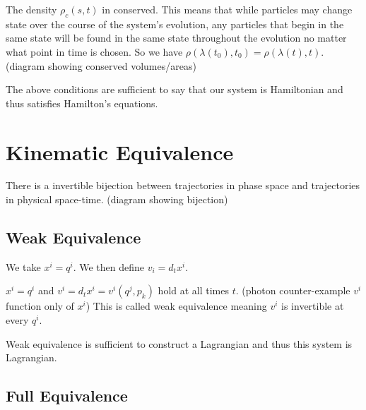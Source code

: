 \documentclass{article}
\begin{document}
\begin{prop}
	The density $\rho_c(s,t)$ in conserved. This means that while particles may change state over the course of the system's evolution, any particles that begin in the same state will be found in the same state throughout the evolution no matter what point in time is chosen. So we have $\rho(\lambda(t_0),t_0) = \rho(\lambda(t),t)$. (diagram showing conserved volumes/areas)
\end{prop}

\begin{prop}
	The above conditions are sufficient to say that our system is Hamiltonian and thus satisfies Hamilton's equations.
\end{prop} 
	

\section{Kinematic Equivalence}

\begin{assump}
	There is a invertible bijection between trajectories in phase space and trajectories in physical space-time. (diagram showing bijection)
\end{assump}

\subsection{Weak Equivalence}

\begin{defn}
	We take $x^i = q^i$. We then define $v_i = d_tx^i$.
\end{defn}

\begin{prop}
	$x^i = q^i$ and $v^i = d_tx^i = v^i(q^j,p_k)$ hold at all times $t$. (photon counter-example $v^i$ function only of $x^i$) This is called weak equivalence meaning $v^i$ is invertible at every $q^i$. 
\end{prop}

\begin{prop}
	Weak equivalence is sufficient to construct a Lagrangian and thus this system is Lagrangian.
\end{prop}

\subsection{Full Equivalence}
\end{document}
